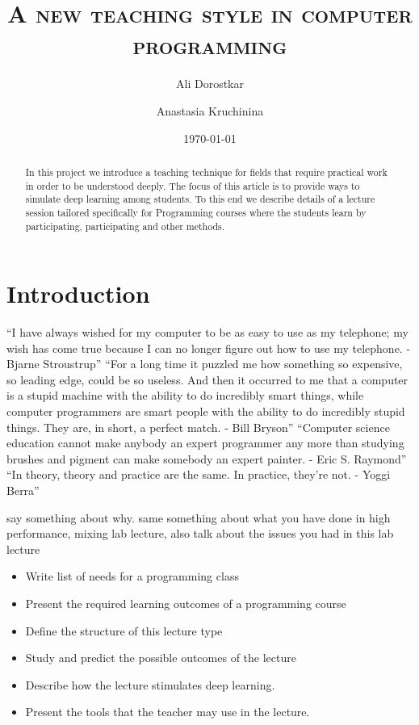 \documentclass{article}
\author{Ali Dorostkar \and Anastasia Kruchinina}
\title{\textsc{A new teaching style in computer programming}}
\date{\today}
\begin{document}
\maketitle \begin{abstract}
In this project we introduce a teaching technique for fields that require
practical work in order to be understood deeply. The focus of this article is 
to provide ways to simulate deep learning among students. To this end we describe 
details of a lecture session tailored specifically for Programming courses
where the students learn by participating, participating and other methods.
\end{abstract}

\section{Introduction} %
\label{sec:introduction}

``I have always wished for my computer to be as easy to use as my telephone;
my wish has come true because I can no longer figure out how to use my
telephone. - Bjarne Stroustrup''
\newline  
\newline
``For a long time it puzzled me how something so expensive, so leading edge,
could be so useless. And then it occurred to me that a computer is a stupid
machine with the ability to do incredibly smart things, while computer
programmers are smart people with the ability to do incredibly stupid things.
They are, in short, a perfect match. - Bill Bryson''
\newline 
\newline
``Computer science education cannot make anybody an expert programmer any
more than studying brushes and pigment can make somebody an expert painter. -
Eric S. Raymond'' 
\newline
\newline
``In theory, theory and practice are the same. In practice,
they’re not. - Yoggi Berra'' 

say something about why.
same something about what you have done in high performance, mixing lab lecture,
also talk about the issues you had in this lab lecture
\begin{itemize}
	\item Write list of needs for a programming class
	\item Present the required learning outcomes of a programming course
	\item Define the structure of this lecture type
	\item Study and predict the possible outcomes of the lecture
	\item Describe how the lecture stimulates deep learning.
	\item Present the tools that the teacher may use in the lecture.
\end{itemize}
\end{document}
